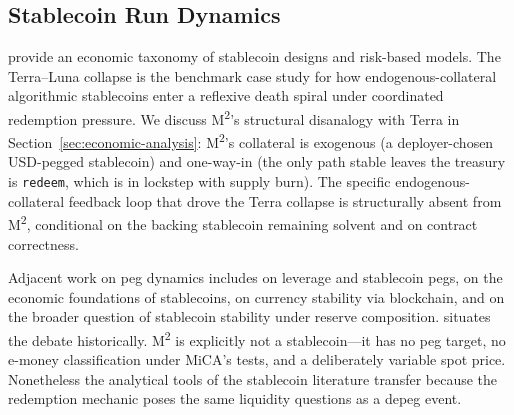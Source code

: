 \subsection{Stablecoin Run Dynamics}
\label{sec:related-stablecoins}

\citet{KlagesMundt2020} provide an economic taxonomy of stablecoin designs and risk-based models. The Terra--Luna collapse \citep{LiuMakarovSchoar2023,Briola2023} is the benchmark case study for how endogenous-collateral algorithmic stablecoins enter a reflexive death spiral under coordinated redemption pressure. We discuss M\textsuperscript{2}'s structural disanalogy with Terra in Section~\ref{sec:economic-analysis}: M\textsuperscript{2}'s collateral is exogenous (a deployer-chosen USD-pegged stablecoin) and one-way-in (the only path stable leaves the treasury is \texttt{redeem}, which is in lockstep with supply burn). The specific endogenous-collateral feedback loop that drove the Terra collapse is structurally absent from M\textsuperscript{2}, conditional on the backing stablecoin remaining solvent and on contract correctness.

Adjacent work on peg dynamics includes \citet{Gorton2022} on leverage and stablecoin pegs, \citet{Catalini2022} on the economic foundations of stablecoins, \citet{Routledge2022} on currency stability via blockchain, and \citet{dAvernas2023} on the broader question of stablecoin stability under reserve composition. \citet{Eichengreen2019} situates the debate historically. M\textsuperscript{2} is explicitly not a stablecoin---it has no peg target, no e-money classification under MiCA's tests, and a deliberately variable spot price. Nonetheless the analytical tools of the stablecoin literature transfer because the redemption mechanic poses the same liquidity questions as a depeg event.
